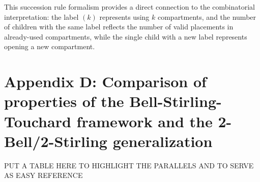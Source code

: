 \documentclass[a4paper]{amsart}
\begin{document}
This succession rule formalism provides a direct connection to the combinatorial interpretation: the label $(k)$ represents using $k$ compartments, and the number of children with the same label reflects the number of valid placements in already-used compartments, while the single child with a new label represents opening a new compartment.

\pagebreak
\section*{Appendix D: Comparison of properties of the Bell-Stirling-Touchard framework and the 2-Bell/2-Stirling generalization}

PUT A TABLE HERE TO HIGHLIGHT THE PARALLELS AND TO SERVE AS EASY REFERENCE
\end{document}
